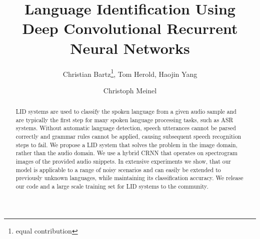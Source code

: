 \documentclass{llncs}
\newcommand{\repeatthanks}{\textsuperscript{\thefootnote}}
\begin{document}
\title{Language Identification Using Deep Convolutional Recurrent Neural Networks}
\author{Christian Bartz\thanks{equal contribution}, Tom Herold\repeatthanks, Haojin Yang \and Christoph Meinel}



\frontmatter

\maketitle

\begin{acronym}
\end{acronym}

\begin{abstract}

	\ac{LID} systems are used to classify the spoken language from a given audio sample and are typically the first step for many spoken language processing tasks, such as \ac{ASR} systems.
	Without automatic language detection, speech utterances cannot be parsed correctly and grammar rules cannot be applied, causing subsequent speech recognition steps to fail.
	We propose a \ac{LID} system that solves the problem in the image domain, rather than the audio domain.
	We use a hybrid \ac{CRNN} that operates on spectrogram images of the provided audio snippets.
	In extensive experiments we show, that our model is applicable to a range of noisy scenarios and can easily be extended to previously unknown languages, while maintaining its classification accuracy.
	We release our code and a large scale training set for \ac{LID} systems to the community.
\end{abstract}
\end{document}
